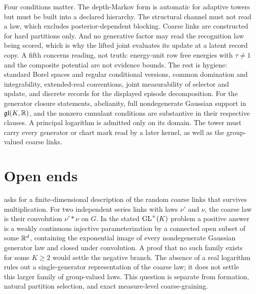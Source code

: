 \begin{hygiene}
Four conditions matter. The depth-Markov form is automatic for adaptive towers but must be built into a
declared hierarchy. The structural channel must not read a law, which excludes posterior-dependent
blocking. Coarse links are constructed for hard partitions only. And no generative factor may read the
recognition law being scored, which is why the lifted joint evaluates its update at a latent record
copy. A fifth concerns reading, not truth: energy-unit row free energies with $\tau\ne1$ and the
composite potential are not evidence bounds. The rest is hygiene: standard Borel spaces and regular
conditional versions, common domination and integrability, extended-real conventions, joint measurability
of selector and update, and discrete records for the displayed episode decomposition.
For the generator closure statements, abelianity, full nondegenerate Gaussian support in
$\mathfrak{gl}(K,\mathbb R)$, and the nonzero cumulant conditions are substantive in their respective
clauses. A principal logarithm is admitted only on its domain. The tower must carry every
generator or chart mark read by a later kernel, as well as the group-valued coarse links.
\end{hygiene}

\section{Open ends}
\label{comp:ch12-open}

 asks for a finite-dimensional description of the random coarse
links that survives multiplication. For two independent series links with laws $\nu'$ and $\nu$,
the coarse law is their convolution $\nu'*\nu$ on $G$. In the stated $\mathrm{GL}^+(K)$ problem a
positive answer is a weakly continuous injective parameterization by a connected open subset of
some $\mathbb R^d$, containing the exponential image of every nondegenerate Gaussian generator law and
closed under convolution. A proof that no such family exists for some $K\ge2$ would settle the
negative branch. The absence of a real logarithm rules out a single-generator representation of
the coarse law; it does not settle this larger family of group-valued laws. This question is
separate from formation, natural partition selection, and exact measure-level coarse-graining.

